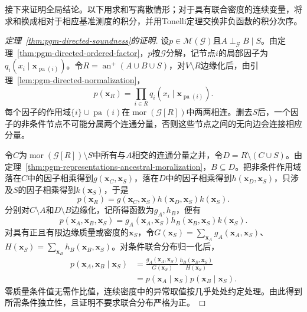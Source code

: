 接下来证明全局结论。以下用求和写离散情形；对于具有联合密度的连续变量，将求和换成相对于相应基准测度的积分，并用Tonelli定理交换非负函数的积分次序。

\begin{proof}[定理~\ref{thm:pgm-directed-soundness}的证明]
设$p\in\mathcal{M}(\mathcal{G})$且$A\perp_{\mathcal{G}}B\mid S$。由定理~\ref{thm:pgm-directed-ordered-factor}，$p$按$\mathcal{G}$分解，记节点$i$的局部因子为$q_i(x_i\mid\bm{x}_{\operatorname{pa}(i)})$。令$R=\operatorname{an}^{+}(A\cup B\cup S)$，对$V\setminus R$边缘化后，由引理~\ref{lem:pgm-directed-normalization}，
\[
  p(\bm{x}_R)=
  \prod_{i\in R}q_i(x_i\mid\bm{x}_{\operatorname{pa}(i)}).
\]
每个因子的作用域$\{i\}\cup\operatorname{pa}(i)$在$\operatorname{mor}(\mathcal{G}[R])$中两两相连。删去$S$后，一个因子的非条件节点不可能分属两个连通分量，否则这些节点之间的无向边会连接相应分量。

令$C$为$\operatorname{mor}(\mathcal{G}[R])\setminus S$中所有与$A$相交的连通分量之并，令$D=R\setminus(C\cup S)$。由定理~\ref{thm:pgm-representations-ancestral-moralization}，$B\subseteq D$。把非条件作用域落在$C$中的因子相乘得到$g(\bm{x}_C,\bm{x}_S)$，落在$D$中的因子相乘得到$h(\bm{x}_D,\bm{x}_S)$，只涉及$S$的因子相乘得到$k(\bm{x}_S)$，于是
\[
  p(\bm{x}_R)=
  g(\bm{x}_C,\bm{x}_S)
  h(\bm{x}_D,\bm{x}_S)
  k(\bm{x}_S).
\]
分别对$C\setminus A$和$D\setminus B$边缘化，记所得函数为$g_A,h_B$，便有
\[
  p(\bm{x}_A,\bm{x}_B,\bm{x}_S)=
  g_A(\bm{x}_A,\bm{x}_S)
  h_B(\bm{x}_B,\bm{x}_S)
  k(\bm{x}_S).
\]
对具有正且有限边缘质量或密度的$\bm{x}_S$，令$G(\bm{x}_S)=\sum_{\bm{x}_A}g_A(\bm{x}_A,\bm{x}_S)$、$H(\bm{x}_S)=\sum_{\bm{x}_B}h_B(\bm{x}_B,\bm{x}_S)$。对条件联合分布归一化后，
\[
  \begin{aligned}
    p(\bm{x}_A,\bm{x}_B\mid\bm{x}_S)
      &=\frac{g_A(\bm{x}_A,\bm{x}_S)}{G(\bm{x}_S)}
        \frac{h_B(\bm{x}_B,\bm{x}_S)}{H(\bm{x}_S)}\\
      &=p(\bm{x}_A\mid\bm{x}_S)
        p(\bm{x}_B\mid\bm{x}_S).
  \end{aligned}
\]
零质量条件值无需作比值，连续密度中的异常取值按几乎处处约定处理。由此得到所需条件独立性，且证明不要求联合分布严格为正。
\end{proof}

